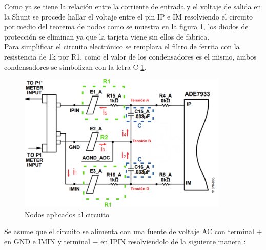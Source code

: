         Como ya se tiene la relación entre la corriente de entrada y el voltaje de salida en la Shunt se procede hallar el voltaje entre el pin IP e IM resolviendo el circuito por medio del teorema de nodos como se muestra en la figura \ref{fig:Nodos}, los diodos de protección se eliminan ya que la tarjeta viene sin ellos de fabrica. \\

        Para simplificar el circuito electrónico se remplaza el filtro de ferrita con la resistencia de 1k por R1, como el valor de los condensadores es el mismo, ambos condensadores se simbolizan con la letra C \ref{fig:Nodos}.

        \begin{figure}[H]
            \begin{center}
                \includegraphics[width = 10cm]{3Proyecto/Nodos.PNG}
                \caption{ Nodos aplicados al circuito} 
                \label{fig:Nodos}
            \end{center}
        \end{figure}

        Se asume que el circuito se alimenta con una fuente de voltaje AC con terminal $+$ en GND e IMIN y terminal $-$ en IPIN resolviendolo de la siguiente manera :
        \\  

